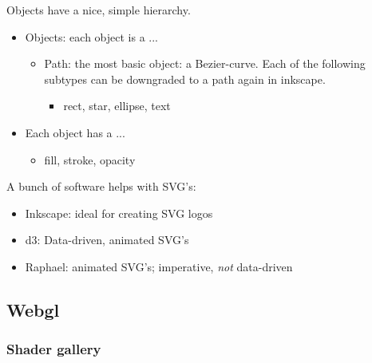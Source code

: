 Objects have a nice, simple hierarchy.
\begin{itemize}
    \item Objects: each object is a ...
        \begin{itemize}
            \item Path: the most basic object: a Bezier-curve. Each of the following subtypes can be downgraded to a path again in inkscape.
                \begin{itemize}
                    \item rect, star, ellipse, text
                \end{itemize}
        \end{itemize}
    \item Each object has a ... 
        \begin{itemize}
            \item fill, stroke, opacity
        \end{itemize}
\end{itemize}

A bunch of software helps with SVG's:
\begin{itemize}
    \item Inkscape: ideal for creating SVG logos
    \item d3: Data-driven, animated SVG's
    \item Raphael: animated SVG's; imperative, \emph{not} data-driven
\end{itemize}


\subsection{Webgl}


\subsubsection{Shader gallery}


